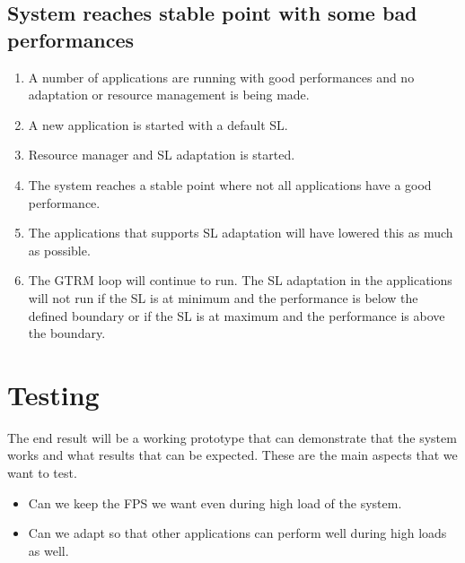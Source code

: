 \documentclass{LTHthesis}
\begin{document}
\section{System reaches stable point with some bad performances}
\begin{enumerate}
\item A number of applications are running with good performances and no adaptation or resource management is being made.
\item A new application is started with a default SL.
\item Resource manager and SL adaptation is started.
\item The system reaches a stable point where not all applications have a good performance. 
\item The applications that supports SL adaptation will have lowered this as much as possible.
\item The GTRM loop will continue to run. The SL adaptation in the applications will not run if the SL is at minimum and the performance is below the defined boundary or if the SL is at maximum and the performance is above the boundary.
\end{enumerate}

\chapter{Testing}
The end result will be a working prototype that can demonstrate that the system works and what results that can be expected. These are the main aspects that we want to test.
\begin{itemize}
\item Can we keep the FPS we want even during high load of the system.
\item Can we adapt so that other applications can perform well during high loads as well. 
\end{itemize}
\end{document}
